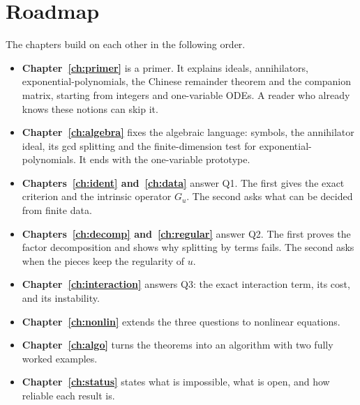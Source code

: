 \section{Roadmap}

The chapters build on each other in the following order.
\begin{itemize}
\item \textbf{Chapter~\ref{ch:primer}} is a primer. It explains ideals, annihilators, exponential-polynomials, the Chinese remainder theorem and the companion matrix, starting from integers and one-variable ODEs. A reader who already knows these notions can skip it.
\item \textbf{Chapter~\ref{ch:algebra}} fixes the algebraic language: symbols, the annihilator ideal, its gcd splitting and the finite-dimension test for exponential-polynomials. It ends with the one-variable prototype.
\item \textbf{Chapters~\ref{ch:ident} and~\ref{ch:data}} answer Q1. The first gives the exact criterion and the intrinsic operator $G_u$. The second asks what can be decided from finite data.
\item \textbf{Chapters~\ref{ch:decomp} and~\ref{ch:regular}} answer Q2. The first proves the factor decomposition and shows why splitting by terms fails. The second asks when the pieces keep the regularity of $u$.
\item \textbf{Chapter~\ref{ch:interaction}} answers Q3: the exact interaction term, its cost, and its instability.
\item \textbf{Chapter~\ref{ch:nonlin}} extends the three questions to nonlinear equations.
\item \textbf{Chapter~\ref{ch:algo}} turns the theorems into an algorithm with two fully worked examples.
\item \textbf{Chapter~\ref{ch:status}} states what is impossible, what is open, and how reliable each result is.
\end{itemize}
